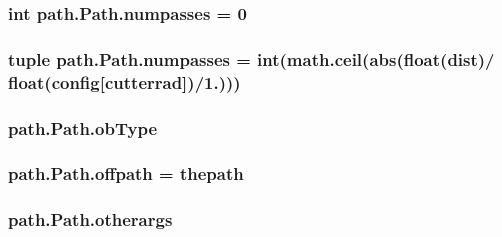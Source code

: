 \subsubsection[{numpasses}]{\setlength{\rightskip}{0pt plus 5cm}int path.\+Path.\+numpasses = 0\hspace{0.3cm}{\ttfamily [static]}}\label{classpath_1_1_path_a63daa52ac2ed46d3c512d22650245b86}
\hypertarget{classpath_1_1_path_a4c7bc21a39224d1712c3cacadf9dc8ca}{}
\subsubsection[{numpasses}]{\setlength{\rightskip}{0pt plus 5cm}tuple path.\+Path.\+numpasses = int(math.\+ceil(abs(float({\bf dist})/ float({\bf config}\mbox{[}\textquotesingle{}cutterrad\textquotesingle{}\mbox{]})/1.)))\hspace{0.3cm}{\ttfamily [static]}}\label{classpath_1_1_path_a4c7bc21a39224d1712c3cacadf9dc8ca}
\hypertarget{classpath_1_1_path_a5f76d0fb0a06d73b38f79528ca7c7611}{}
\subsubsection[{ob\+Type}]{\setlength{\rightskip}{0pt plus 5cm}path.\+Path.\+ob\+Type}\label{classpath_1_1_path_a5f76d0fb0a06d73b38f79528ca7c7611}
\hypertarget{classpath_1_1_path_a9c87a4a17044e1bdfc596ebc4f894b60}{}
\subsubsection[{offpath}]{\setlength{\rightskip}{0pt plus 5cm}path.\+Path.\+offpath = {\bf thepath}\hspace{0.3cm}{\ttfamily [static]}}\label{classpath_1_1_path_a9c87a4a17044e1bdfc596ebc4f894b60}
\hypertarget{classpath_1_1_path_a78b59e663ba7afb929d918d74081e6f6}{}
\subsubsection[{otherargs}]{\setlength{\rightskip}{0pt plus 5cm}path.\+Path.\+otherargs}\label{classpath_1_1_path_a78b59e663ba7afb929d918d74081e6f6}
\hypertarget{classpath_1_1_path_a3b09da18da506517817d6b1d85c08aa8}{}
